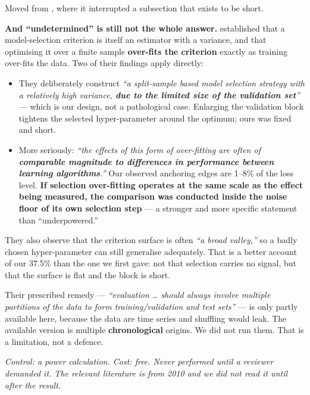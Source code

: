 Moved from , where it interrupted a subsection that exists to be short.

\textbf{And ``undetermined'' is still not the whole answer.} \citet{cawley2010over} established that
a model-selection criterion is itself an estimator with a variance, and that optimising it over
a finite sample \textbf{over-fits the criterion} exactly as training over-fits the data. Two of their
findings apply directly:

\begin{itemize}
\tightlist
\item
  They deliberately construct \emph{``a split-sample based model selection strategy with a relatively
  high variance, \textbf{due to the limited size of the validation set}''} --- which is our design, not
  a pathological case. Enlarging the validation block tightens the selected hyper-parameter
  around the optimum; ours was fixed and short.
\item
  More seriously: \emph{``the effects of this form of over-fitting are often of \textbf{comparable magnitude
  to differences in performance between learning algorithms}.''} Our observed anchoring edges
  are 1--8\% of the loss level. \textbf{If selection over-fitting operates at the same scale as the
  effect being measured, the comparison was conducted inside the noise floor of its own
  selection step} --- a stronger and more specific statement than ``underpowered.''
\end{itemize}

They also observe that the criterion surface is often \emph{``a broad valley,''} so a badly chosen
hyper-parameter can still generalise adequately. That is a better account of our 37.5\% than the
one we first gave: not that selection carries no signal, but that the surface is flat and the
block is short.

Their prescribed remedy --- \emph{``evaluation \ldots{} should always involve multiple partitions of the data
to form training/validation and test sets''} --- is only partly available here, because the data
are time series and shuffling would leak. The available version is multiple \textbf{chronological}
origins. We did not run them. That is a limitation, not a defence.

\emph{Control: a power calculation. Cost: free. Never performed until a reviewer demanded it. The
relevant literature is from 2010 and we did not read it until after the result.}
